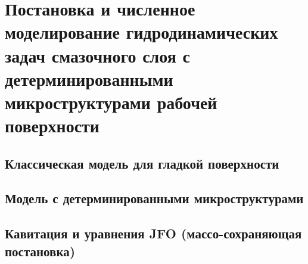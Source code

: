 \chapter{Постановка и численное моделирование гидродинамических задач смазочного слоя с детерминированными микроструктурами рабочей поверхности}

\section{Классическая модель для гладкой поверхности}

\FloatBarrier

\FloatBarrier

\FloatBarrier

\FloatBarrier

\FloatBarrier

\FloatBarrier


\FloatBarrier
\section{Модель с детерминированными микроструктурами}

\FloatBarrier

\FloatBarrier

\FloatBarrier


\FloatBarrier
\section{Кавитация и уравнения JFO (массо-сохраняющая постановка)}

\FloatBarrier

\FloatBarrier


\FloatBarrier

